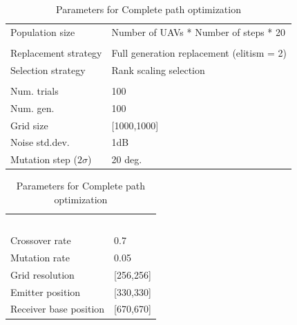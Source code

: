 \documentclass[10pt,a4paper]{book}
\begin{document}

\begin{table}[H]
\centering
\caption{Parameters for Complete path optimization}
\begin{minipage}{60mm}
\small
\begin{tabular}{l l}
Population size & Number of UAVs * Number of steps * 20   \\  
& \\
Replacement strategy & Full generation replacement (elitism = 2) \\  
Selection strategy &  Rank scaling selection   \\  
& \\
Num. trials & 100  \\
Num. gen. & 100  \\
Grid size & [1000,1000] \\
Noise std.dev. & 1dB \\
Mutation step ($2\sigma$)  & 20 deg. 

\end{tabular}
\end{minipage}
\centering
\begin{minipage}{60mm}
\small
\begin{tabular}{l l}
& \\
& \\
& \\
& \\
& \\
Crossover rate & 0.7 \\ 
Mutation rate & 0.05  \\ 
Grid resolution & [256,256] \\
Emitter position & [330,330] \\
Receiver base position & [670,670]\\

\end{tabular}

\end{minipage}
\end{table}
\end{document}
